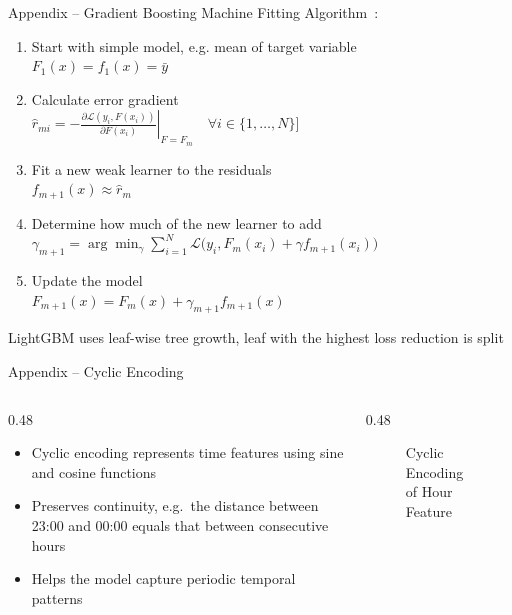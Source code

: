 \documentclass[10pt, aspectratio=169]{beamer}
\begin{document}
\begin{frame}{Appendix -- Gradient Boosting Machine}
    Fitting Algorithm~\cite{hastie_2001_elements}:
    \begin{enumerate}
        \item Start with simple model, e.g. mean of target variable \\
        $F_1(x)=f_1(x)=\bar{y}$
        
        \item Calculate error gradient \\
        $\hat{r}_{mi} = -\left. \frac{\partial \mathcal{L}(y_i, F(x_i))} {\partial F(x_i)} \right|_{F = F_m} \quad \forall i \in \{1,\dots,N\}]$
        
        \item Fit a new weak learner to the residuals \\
        $f_{m+1}(x) \approx \hat{r}_m$
        
        \item Determine how much of the new learner to add \\
        $\gamma_{m+1}=\arg\min_{\gamma}\sum_{i=1}^{N}\mathcal{L}\bigl(y_i,F_m(x_i) + \gamma f_{m+1}(x_i)\bigr)$

        \item Update the model \\
        $F_{m+1}(x)=F_m(x)+\gamma_{m+1} f_{m+1}(x)$
    \end{enumerate}
    LightGBM uses leaf-wise tree growth, leaf with the highest loss reduction is split~\cite{shi_2025_lightgbm}
\end{frame}

\begin{frame}{Appendix -- Cyclic Encoding}
    \begin{columns}
        \begin{column}{0.48\textwidth}
            \begin{itemize}
                \item Cyclic encoding represents time features using sine and cosine functions~\cite{pedregosa_2011_scikit}
                \item Preserves continuity, e.g.\ the distance between 23:00 and 00:00 equals that between consecutive hours
                \item Helps the model capture periodic temporal patterns
            \end{itemize}
        \end{column}
        \begin{column}{0.48\textwidth}
            \begin{figure}
                \centering
                
                \caption{Cyclic Encoding of Hour Feature}
                \label{fig:SHAP}
            \end{figure}
        \end{column}
    \end{columns}
\end{frame}
\end{document}
